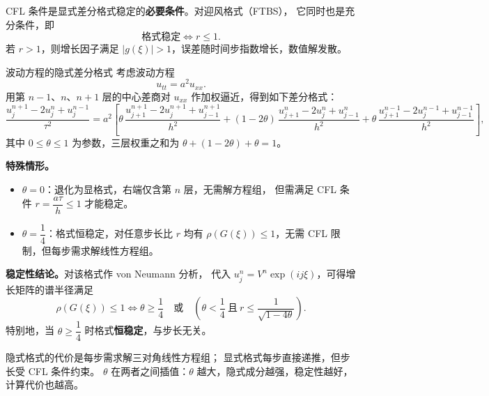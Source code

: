\begin{note}
CFL 条件是显式差分格式稳定的\textbf{必要条件}。对迎风格式（FTBS），
它同时也是充分条件，即
\[
\text{格式稳定} \iff r \leq 1.
\]
若 $r > 1$，则增长因子满足 $|g(\xi)| > 1$，误差随时间步指数增长，数值解发散。
\end{note}
\begin{example}{波动方程的隐式差分格式}
考虑波动方程
\[
u_{tt} = a^2 u_{xx}.
\]
用第 $n-1$、$n$、$n+1$ 层的中心差商对 $u_{xx}$ 作加权逼近，得到如下差分格式：
\[
\frac{u_j^{n+1} - 2u_j^n + u_j^{n-1}}{\tau^2}
= a^2 \left[
\theta\,\frac{u_{j+1}^{n+1} - 2u_j^{n+1} + u_{j-1}^{n+1}}{h^2}
+ (1-2\theta)\,\frac{u_{j+1}^{n} - 2u_j^{n} + u_{j-1}^{n}}{h^2}
+ \theta\,\frac{u_{j+1}^{n-1} - 2u_j^{n-1} + u_{j-1}^{n-1}}{h^2}
\right],
\]
其中 $0 \leq \theta \leq 1$ 为参数，三层权重之和为 $\theta + (1-2\theta) + \theta = 1$。

\noindent\textbf{特殊情形。}
\begin{itemize}
    \item $\theta = 0$：退化为显格式，右端仅含第 $n$ 层，无需解方程组，
    但需满足 CFL 条件 $r = \dfrac{a\tau}{h} \leq 1$ 才能稳定。
    \item $\theta = \dfrac{1}{4}$：格式恒稳定，对任意步长比 $r$ 均有
    $\rho\!\left(G(\xi)\right) \leq 1$，无需 CFL 限制，但每步需求解线性方程组。
\end{itemize}

\noindent\textbf{稳定性结论。}对该格式作 von Neumann 分析，
代入 $u_j^n = V^n \exp(ij\xi)$，可得增长矩阵的谱半径满足
\[
\rho\!\left(G(\xi)\right) \leq 1
\iff
\theta \geq \frac{1}{4} \quad \text{或} \quad
\left(\theta < \frac{1}{4} \ \text{且} \ r \leq \frac{1}{\sqrt{1-4\theta}}\right).
\]
特别地，当 $\theta \geq \dfrac{1}{4}$ 时格式\textbf{恒稳定}，与步长无关。
\end{example}

\begin{note}
隐式格式的代价是每步需求解三对角线性方程组；
显式格式每步直接递推，但步长受 CFL 条件约束。
$\theta$ 在两者之间插值：$\theta$ 越大，隐式成分越强，稳定性越好，
计算代价也越高。
\end{note}
